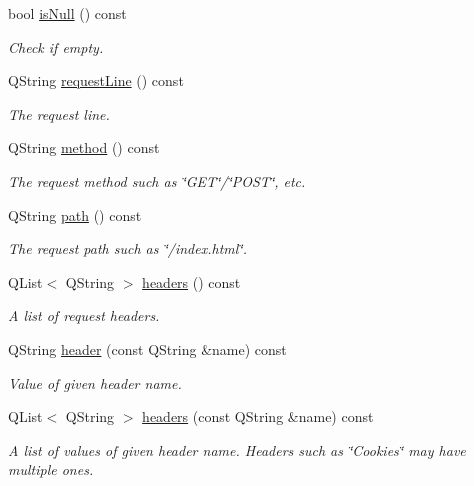 \begin{DoxyCompactItemize}
\item 
bool \hyperlink{class_recorded_request_ae79ac696d5a57db8102789eb1f0929f4}{is\+Null} () const 
\begin{DoxyCompactList}\small\item\em Check if empty. \end{DoxyCompactList}\item 
Q\+String \hyperlink{class_recorded_request_ab2324bf506aa3e1004d161ea5e5ab97e}{request\+Line} () const 
\begin{DoxyCompactList}\small\item\em The request line. \end{DoxyCompactList}\item 
Q\+String \hyperlink{class_recorded_request_a3d84b8e2b214b74d4c6e1f8e3df098c2}{method} () const 
\begin{DoxyCompactList}\small\item\em The request method such as \char`\"{}\+G\+E\+T\char`\"{}/\char`\"{}\+P\+O\+S\+T\char`\"{}, etc. \end{DoxyCompactList}\item 
Q\+String \hyperlink{class_recorded_request_a77f871f46f16551e2d49e2d8500f8a21}{path} () const 
\begin{DoxyCompactList}\small\item\em The request path such as \char`\"{}/index.\+html\char`\"{}. \end{DoxyCompactList}\item 
Q\+List$<$ Q\+String $>$ \hyperlink{class_recorded_request_a3ed5bf33c7903c9078e49eae577d127b}{headers} () const 
\begin{DoxyCompactList}\small\item\em A list of request headers. \end{DoxyCompactList}\item 
Q\+String \hyperlink{class_recorded_request_ac609ec48565b1b46752d777d06ea6134}{header} (const Q\+String \&name) const 
\begin{DoxyCompactList}\small\item\em Value of given header name. \end{DoxyCompactList}\item 
Q\+List$<$ Q\+String $>$ \hyperlink{class_recorded_request_a851d5972e3e330ff75b84d514eccb51e}{headers} (const Q\+String \&name) const 
\begin{DoxyCompactList}\small\item\em A list of values of given header name. Headers such as \char`\"{}\+Cookies\char`\"{} may have multiple ones. \end{DoxyCompactList}\item 

\end{DoxyCompactItemize}
